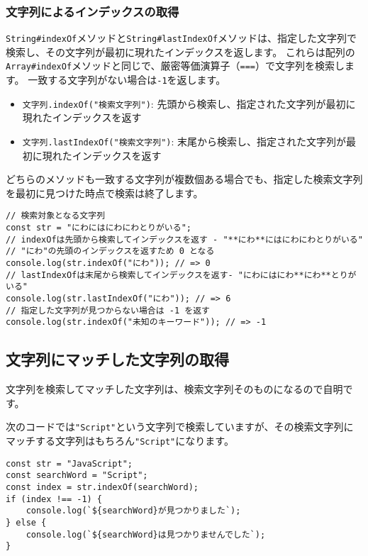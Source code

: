 \hypertarget{search-index-by-string}{%
\subsubsection{文字列によるインデックスの取得}\label{search-index-by-string}}

\texttt{String\#indexOf}メソッドと\texttt{String\#lastIndexOf}メソッドは、指定した文字列で検索し、その文字列が最初に現れたインデックスを返します。
これらは配列の\texttt{Array\#indexOf}メソッドと同じで、厳密等価演算子（\texttt{===}）で文字列を検索します。
一致する文字列がない場合は\texttt{-1}を返します。

\begin{itemize}
\item
  \texttt{文字列.indexOf("検索文字列")}:
  先頭から検索し、指定された文字列が最初に現れたインデックスを返す
\item
  \texttt{文字列.lastIndexOf("検索文字列")}:
  末尾から検索し、指定された文字列が最初に現れたインデックスを返す
\end{itemize}

どちらのメソッドも一致する文字列が複数個ある場合でも、指定した検索文字列を最初に見つけた時点で検索は終了します。

\begin{lstlisting}
// 検索対象となる文字列
const str = "にわにはにわにわとりがいる";
// indexOfは先頭から検索してインデックスを返す - "**にわ**にはにわにわとりがいる"
// "にわ"の先頭のインデックスを返すため 0 となる
console.log(str.indexOf("にわ")); // => 0
// lastIndexOfは末尾から検索してインデックスを返す- "にわにはにわ**にわ**とりがいる"
console.log(str.lastIndexOf("にわ")); // => 6
// 指定した文字列が見つからない場合は -1 を返す
console.log(str.indexOf("未知のキーワード")); // => -1
\end{lstlisting}

\hypertarget{match-by-string}{%
\subsection{文字列にマッチした文字列の取得}\label{match-by-string}}

文字列を検索してマッチした文字列は、検索文字列そのものになるので自明です。

次のコードでは\texttt{"Script"}という文字列で検索していますが、その検索文字列にマッチする文字列はもちろん\texttt{"Script"}になります。

\begin{lstlisting}
const str = "JavaScript";
const searchWord = "Script";
const index = str.indexOf(searchWord);
if (index !== -1) {
    console.log(`${searchWord}が見つかりました`);
} else {
    console.log(`${searchWord}は見つかりませんでした`);
}
\end{lstlisting}

